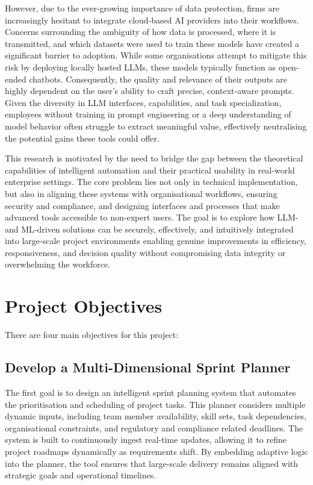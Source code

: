\documentclass{report}
\begin{document}
However, due to the ever-growing importance of data protection, firms are increasingly hesitant to integrate cloud-based AI providers into their workflows. Concerns surrounding the ambiguity of how data is processed, where it is transmitted, and which datasets were used to train these models have created a significant barrier to adoption. While some organisations attempt to mitigate this risk by deploying locally hosted LLMs, these models typically function as open-ended chatbots. Consequently, the quality and relevance of their outputs are highly dependent on the user's ability to craft precise, context-aware prompts. Given the diversity in LLM interfaces, capabilities, and task specialization, employees without training in prompt engineering or a deep understanding of model behavior often struggle to extract meaningful value, effectively neutralising the potential gains these tools could offer.

This research is motivated by the need to bridge the gap between the theoretical capabilities of intelligent automation and their practical usability in real-world enterprise settings. The core problem lies not only in technical implementation, but also in aligning these systems with organisational workflows, ensuring security and compliance, and designing interfaces and processes that make advanced tools accessible to non-expert users. The goal is to explore how LLM- and ML-driven solutions can be securely, effectively, and intuitively integrated into large-scale project environments enabling genuine improvements in efficiency, responsiveness, and decision quality without compromising data integrity or overwhelming the workforce.


\section{Project Objectives}

There are four main objectives for this project:
\subsection{Develop a Multi-Dimensional Sprint Planner}
The first goal is to design an intelligent sprint planning system that automates the prioritisation and scheduling of project tasks. This planner considers multiple dynamic inputs, including team member availability, skill sets, task dependencies, organisational constraints, and regulatory and compliance related deadlines. The system is built to continuously ingest real-time updates, allowing it to refine project roadmaps dynamically as requirements shift. By embedding adaptive logic into the planner, the tool ensures that large-scale delivery remains aligned with strategic goals and operational timelines.
\end{document}
